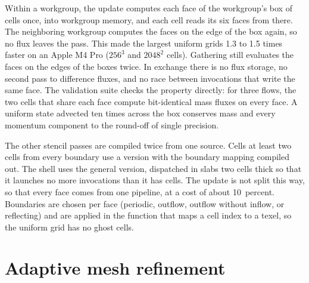 \documentclass[twocolumn]{aastex701}
\begin{document}
Within a workgroup, the update computes each face of the workgroup's box of cells once, into workgroup memory, and each cell reads its six faces from there. The neighboring workgroup computes the faces on the edge of the box again, so no flux leaves the pass. This made the largest uniform grids 1.3 to 1.5 times faster on an Apple M4 Pro ($256^3$ and $2048^2$ cells). Gathering still evaluates the faces on the edges of the boxes twice. In exchange there is no flux storage, no second pass to difference fluxes, and no race between invocations that write the same face. The validation suite checks the property directly: for three flows, the two cells that share each face compute bit-identical mass fluxes on every face. A uniform state advected ten times across the box conserves mass and every momentum component to the round-off of single precision.

The other stencil passes are compiled twice from one source. Cells at least two cells from every boundary use a version with the boundary mapping compiled out. The shell uses the general version, dispatched in slabs two cells thick so that it launches no more invocations than it has cells. The update is not split this way, so that every face comes from one pipeline, at a cost of about 10~percent. Boundaries are chosen per face (periodic, outflow, outflow without inflow, or reflecting) and are applied in the function that maps a cell index to a texel, so the uniform grid has no ghost cells.

\section{Adaptive mesh refinement}
\label{sec:amr}
\end{document}
